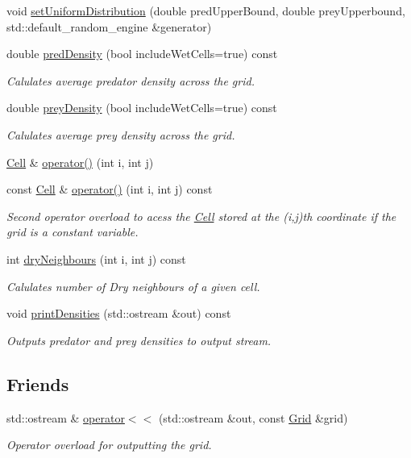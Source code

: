 \begin{DoxyCompactItemize}
\item 
void \hyperlink{class_grid_a17c062fcf4063a811bd8d95c32bce723}{set\+Uniform\+Distribution} (double pred\+Upper\+Bound, double prey\+Upperbound, std\+::default\+\_\+random\+\_\+engine \&generator)
\item 
double \hyperlink{class_grid_a25eeb1fef1d86fe74b45e615f0376158}{pred\+Density} (bool include\+Wet\+Cells=true) const
\begin{DoxyCompactList}\small\item\em Calulates average predator density across the grid. \end{DoxyCompactList}\item 
double \hyperlink{class_grid_a7dc8ae18c31e8e680f6369d7c07ea881}{prey\+Density} (bool include\+Wet\+Cells=true) const
\begin{DoxyCompactList}\small\item\em Calulates average prey density across the grid. \end{DoxyCompactList}\item 
\hyperlink{class_cell}{Cell} \& \hyperlink{class_grid_aed06be122077b3a0c1fe7c412c2535fc}{operator()} (int i, int j)
\item 
const \hyperlink{class_cell}{Cell} \& \hyperlink{class_grid_aa89f5c17cb78658f3b82a3b2d93aeb92}{operator()} (int i, int j) const
\begin{DoxyCompactList}\small\item\em Second operator overload to acess the \hyperlink{class_cell}{Cell} stored at the (i,j)th coordinate if the grid is a constant variable. \end{DoxyCompactList}\item 
int \hyperlink{class_grid_a50f4c0db20b466c84a1d65004e51642e}{dry\+Neighbours} (int i, int j) const
\begin{DoxyCompactList}\small\item\em Calulates number of Dry neighbours of a given cell. \end{DoxyCompactList}\item 
void \hyperlink{class_grid_a4971cb9d47440bc63488993d5647f943}{print\+Densities} (std\+::ostream \&out) const
\begin{DoxyCompactList}\small\item\em Outputs predator and prey densities to output stream. \end{DoxyCompactList}\end{DoxyCompactItemize}
\subsection*{Friends}
\begin{DoxyCompactItemize}
\item 
std\+::ostream \& \hyperlink{class_grid_a3513576c9cced69b185e4be8fe248e8c}{operator$<$$<$} (std\+::ostream \&out, const \hyperlink{class_grid}{Grid} \&grid)
\begin{DoxyCompactList}\small\item\em Operator overload for outputting the grid. \end{DoxyCompactList}\end{DoxyCompactItemize}


